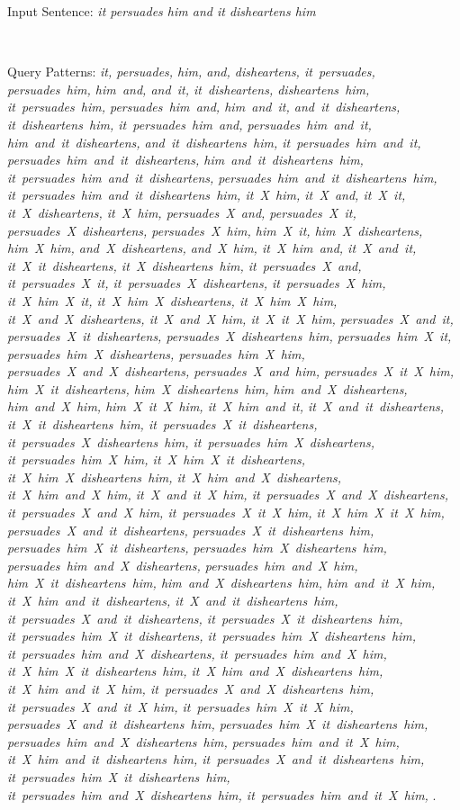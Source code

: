 \noindent Input Sentence:
{\em it persuades him and it disheartens him}

~

\noindent Query Patterns:
{\em
it, persuades, him, and, disheartens, 
it~persuades, persuades~him, him~and, and~it, it~disheartens, disheartens~him,
it~persuades~him, persuades~him~and, him~and~it, and~it~disheartens, it~disheartens~him,
it~persuades~him~and, persuades~him~and~it, him~and~it~disheartens, and~it~disheartens~him,
it~persuades~him~and~it, persuades~him~and~it~disheartens, him~and~it~disheartens~him,
it~persuades~him~and~it~disheartens, persuades~him~and~it~disheartens~him,
it~persuades~him~and~it~disheartens~him,
it~X~him, it~X~and, it~X~it, it~X~disheartens, it~X~him,
persuades~X~and, persuades~X~it, persuades~X~disheartens, persuades~X~him,
him~X~it, him~X~disheartens, him~X~him,
and~X~disheartens, and~X~him,
it~X~him~and, it~X~and~it, it~X~it~disheartens, it~X~disheartens~him,
it~persuades~X~and, it~persuades~X~it, it~persuades~X~disheartens, it~persuades~X~him,
it~X~him~X~it, it~X~him~X~disheartens, it~X~him~X~him,
it~X~and~X~disheartens, it~X~and~X~him,
it~X~it~X~him,
persuades~X~and~it, persuades~X~it~disheartens, persuades~X~disheartens~him,
persuades~him~X~it, persuades~him~X~disheartens, persuades~him~X~him,
persuades~X~and~X~disheartens, persuades~X~and~him,
persuades~X~it~X~him,
him~X~it~disheartens, him~X~disheartens~him, 
him~and~X~disheartens, him~and~X~him,
him~X~it~X~him,
it~X~him~and~it, it~X~and~it~disheartens, it~X~it~disheartens~him, 
it~persuades~X~it~disheartens, it~persuades~X~disheartens~him,
it~persuades~him~X~disheartens, it~persuades~him~X~him,
it~X~him~X~it~disheartens, it~X~him~X~disheartens~him,
it~X~him~and~X~disheartens, it~X~him~and~X~him,
it~X~and~it~X~him,
it~persuades~X~and~X~disheartens, it~persuades~X~and~X~him,
it~persuades~X~it~X~him,
it~X~him~X~it~X~him,
persuades~X~and~it~disheartens, persuades~X~it~disheartens~him,
persuades~him~X~it~disheartens, persuades~him~X~disheartens~him, 
persuades~him~and~X~disheartens, persuades~him~and~X~him,
him~X~it~disheartens~him,
him~and~X~disheartens~him,
him~and~it~X~him,
it~X~him~and~it~disheartens,
it~X~and~it~disheartens~him,
it~persuades~X~and~it~disheartens,
it~persuades~X~it~disheartens~him,
it~persuades~him~X~it~disheartens,
it~persuades~him~X~disheartens~him,
it~persuades~him~and~X~disheartens,
it~persuades~him~and~X~him,
it~X~him~X~it~disheartens~him,
it~X~him~and~X~disheartens~him,
it~X~him~and~it~X~him,
it~persuades~X~and~X~disheartens~him,
it~persuades~X~and~it~X~him,
it~persuades~him~X~it~X~him,
persuades~X~and~it~disheartens~him,
persuades~him~X~it~disheartens~him,
persuades~him~and~X~disheartens~him,
persuades~him~and~it~X~him,
it~X~him~and~it~disheartens~him,
it~persuades~X~and~it~disheartens~him,
it~persuades~him~X~it~disheartens~him,
it~persuades~him~and~X~disheartens~him,
it~persuades~him~and~it~X~him,
}.
